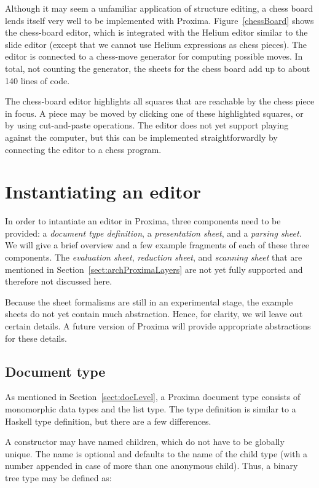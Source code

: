 Although it may seem a unfamiliar application of structure editing, a chess board lends itself very well to be implemented with Proxima.  Figure~\ref{chessBoard} shows the chess-board editor, which is integrated with the Helium editor similar to the slide editor (except that we cannot use Helium expressions as chess pieces). The editor is connected to a chess-move generator for computing possible moves. In total, not counting the generator, the sheets for the chess board add up to about 140 lines of code.


The chess-board editor highlights all squares that are reachable by the chess piece in focus. A piece may be moved by clicking one of these highlighted squares, or by using cut-and-paste operations. The editor does not yet support playing against the computer, but this can be implemented straightforwardly by connecting the editor to a chess program. 


%																
%																
%																
\section{Instantiating an editor} \label{sect:instantiating}

In order to intantiate an editor in Proxima, three components need to be provided: a {\em document type definition}, a {\em presentation sheet}, and a {\em parsing sheet}. We will give a brief overview and a few example fragments of each of these three components. The {\em evaluation sheet}, {\em reduction sheet}, and {\em scanning sheet} that are mentioned in Section~\ref{sect:archProximaLayers} are not yet fully supported and therefore not discussed here.

Because the sheet formalisms are still in an experimental stage, the example sheets do not yet contain much abstraction. Hence, for clarity, we wil leave out certain details. A future version of Proxima will provide appropriate abstractions for these details. 

\subsection{Document type}

As mentioned in Section~\ref{sect:docLevel}, a Proxima document type consists of monomorphic data types and the list type. The type definition is similar to a Haskell type definition, but there are a few differences. 

A constructor may have named children, which do not have to be globally unique. The name is optional and defaults to the name of the child type (with a number appended in case of more than one anonymous child). Thus, a binary tree type may be defined as:

